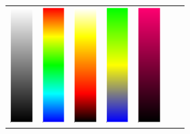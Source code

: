 \begin{figure}[htbp]
    \centering
    \begin{tabular}{ccccccc}
    \includegraphics[height=1.75in]{figures/colormaps/grayscale.png}&
      \includegraphics[height=1.75in]{figures/colormaps/rainbow.png}&
      \includegraphics[height=1.75in]{figures/colormaps/heatmap.png}&         
     \includegraphics[height=1.75in]{figures/colormaps/blueYellowGreen.png}&
      \includegraphics[height=1.75in]{figures/colormaps/blackGradient.png}&

\end{tabular}
\end{figure}
